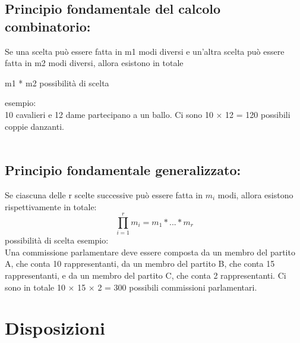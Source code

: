\documentclass[12pt, letterpaper]{article}
\begin{document}
\subsection{Principio fondamentale del calcolo combinatorio:}
Se una scelta può essere fatta in m1 modi diversi e un’altra scelta può
essere fatta in m2 modi diversi, allora esistono in totale
\begin{center}
	m1 * m2 possibilità di scelta
\end{center}
esempio:
\\10 cavalieri e 12 dame partecipano a un ballo.
Ci sono 10 × 12 = 120 possibili coppie danzanti.
\\
\\
\subsection{Principio fondamentale generalizzato:}

Se ciascuna delle r scelte successive può essere fatta in \(m_i\) modi, allora esistono rispettivamente in totale:
\[\prod_{i=1}^{r}m_i = m_1 * ... * m_r \]possibilità di scelta
esempio:\\
Una commissione parlamentare deve essere composta da un
membro del partito A, che conta 10 rappresentanti, da un membro del
partito B, che conta 15 rappresentanti, e da un membro del partito C,
che conta 2 rappresentanti.
Ci sono in totale 10 × 15 × 2 = 300 possibili commissioni
parlamentari.

\section{Disposizioni}
\end{document}
